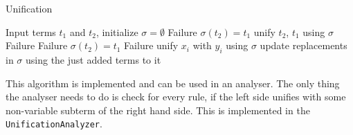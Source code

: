 \begin{algorithm}
\caption{Unification}
\label{unification}
\begin{algorithmic}[5]
\STATE Input terms $t_1$ and $t_2$, initialize $\sigma = \emptyset$
        \RETURN Failure
      \ELSE
        \STATE $\sigma(t_2) = t_1$
      \ENDIF
    \ENDIF
  \ELSE
    \RETURN unify $t_2$, $t_1$ using $\sigma$
  \ENDIF
{}
      \RETURN Failure
      \RETURN Failure
    \ELSE 
      \STATE $\sigma(t_2) = t_1$
    \ENDIF
      \RETURN Failure
    \ENDIF
      \STATE unify $x_i$ with $y_i$ using $\sigma$
      \STATE update replacements in $\sigma$ using the just added terms to it
    \ENDFOR
  \ENDIF
\ENDIF
\end{algorithmic}
\end{algorithm}

This algorithm is implemented and can be used in an analyser. The only thing the analyser needs to do is check for every rule, if the left side unifies with some non-variable subterm of the right hand side. This is implemented in the \texttt{UnificationAnalyzer}.